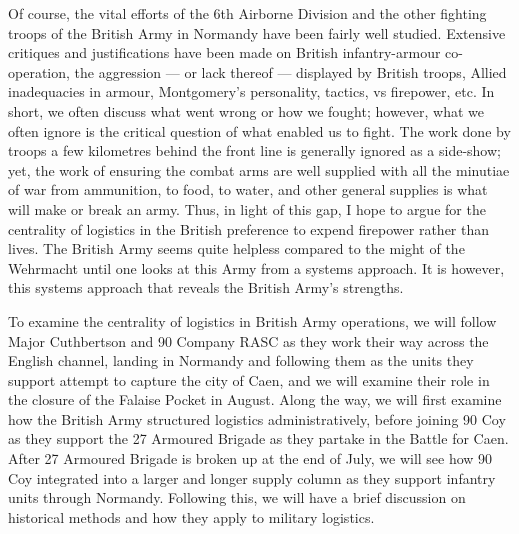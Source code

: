 \documentclass[noraggedright]{turabian-researchpaper}
\begin{document}




Of course, the vital efforts of the 6th Airborne Division and the other 
fighting troops of the British Army in Normandy have been fairly well studied.
Extensive critiques and justifications have been made on British 
infantry-armour co-operation, the aggression --- or lack thereof --- displayed
by British troops, Allied inadequacies in armour, Montgomery's personality,
tactics, vs firepower, etc.  %
In short, we often discuss what went wrong or 
how we fought; however, what we often ignore is the critical question of what
enabled us to fight. The work done by troops a few kilometres behind the front 
line is generally ignored as a side-show; yet, the work of ensuring the combat 
arms are well supplied with all the minutiae of war from ammunition, to food, 
to water, and other general supplies is what will make or break an army. Thus,
in light of this gap, I hope to argue for the centrality of logistics in the
British preference to expend firepower rather than lives.  The British Army
seems quite helpless compared to the might of the Wehrmacht until one looks
at this Army from a systems approach.  It is however, this systems approach
that reveals the British Army's strengths.  %

To examine the centrality of logistics in British Army operations, we will 
follow Major Cuthbertson
and 90 Company RASC as they work their way across the English channel, landing
in Normandy and following them as the units they support attempt to capture the
city of Caen, and we will examine their role in the closure of the Falaise 
Pocket in August.  Along the way, we will first examine how the British Army 
structured logistics administratively, before joining 90 Coy as they support
the 27 Armoured Brigade as they partake in the Battle for Caen.  
After 27 Armoured Brigade is broken up at the end of July,
we will see how 90 Coy integrated into a larger and longer supply column as
they support infantry units through Normandy. Following this, we will have 
a brief discussion on historical methods and how they apply to military 
logistics.  %
\end{document}
